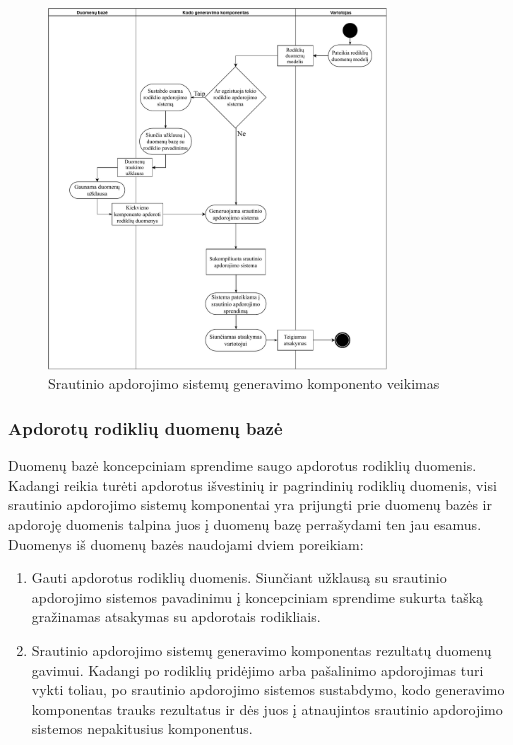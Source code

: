 \documentclass{VUMIFPSbakalaurinis}
\begin{document}
\begin{figure}[H]
    \centering
    \includegraphics[width=0.8\textwidth]{img/generation-flow.pdf}
    \caption{Srautinio apdorojimo sistemų generavimo komponento veikimas}
    \label{img:generation-flow}
\end{figure}

\subsubsection{Apdorotų rodiklių duomenų bazė}

Duomenų bazė koncepciniam sprendime saugo apdorotus rodiklių duomenis. Kadangi reikia turėti apdorotus išvestinių ir pagrindinių rodiklių duomenis, visi srautinio apdorojimo sistemų komponentai yra prijungti prie duomenų bazės ir apdoroję duomenis talpina juos į duomenų bazę perrašydami ten jau esamus. Duomenys iš duomenų bazės naudojami dviem poreikiam: 
\begin{enumerate}
    \item Gauti apdorotus rodiklių duomenis. Siunčiant užklausą su srautinio apdorojimo sistemos pavadinimu į koncepciniam sprendime sukurta tašką  gražinamas atsakymas su apdorotais rodikliais. 
    \item Srautinio apdorojimo sistemų generavimo komponentas rezultatų duomenų gavimui. Kadangi po rodiklių pridėjimo arba pašalinimo apdorojimas turi vykti toliau, po srautinio apdorojimo sistemos sustabdymo, kodo generavimo komponentas trauks rezultatus ir dės juos į atnaujintos srautinio apdorojimo sistemos nepakitusius komponentus.   
\end{enumerate}  
\end{document}

